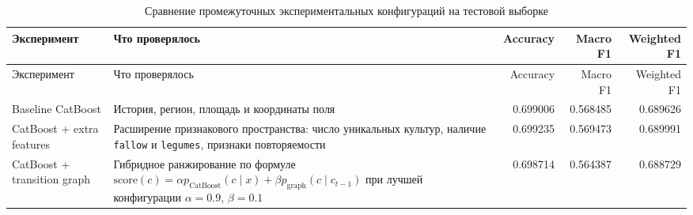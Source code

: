 \begin{center}
\scriptsize
\begin{longtable}{p{} p{} r r r}
\caption{Сравнение промежуточных экспериментальных конфигураций на тестовой выборке}
\label{tab:intermediate-experiments-metrics}\\
\toprule
Эксперимент & Что проверялось & Accuracy & Macro F1 & Weighted F1 \\
\midrule
\endfirsthead

\toprule
Эксперимент & Что проверялось & Accuracy & Macro F1 & Weighted F1 \\
\midrule
\endhead

\bottomrule
\endlastfoot

Baseline CatBoost &
История, регион, площадь и координаты поля &
0.699006 & 0.568485 & 0.689626 \\

CatBoost + extra features &
Расширение признакового пространства: число уникальных культур, наличие \texttt{fallow} и \texttt{legumes}, признаки
повторяемости &
0.699235 & 0.569473 & 0.689991 \\

CatBoost + transition graph &
Гибридное ранжирование по формуле
\(\mathrm{score}(c)=\alpha p_{\mathrm{CatBoost}}(c\mid x)+\beta p_{\mathrm{graph}}(c\mid c_{t-1})\)
при лучшей конфигурации \(\alpha=0.9\), \(\beta=0.1\) &
0.698714 & 0.564387 & 0.688729 \\

\end{longtable}
\end{center}
